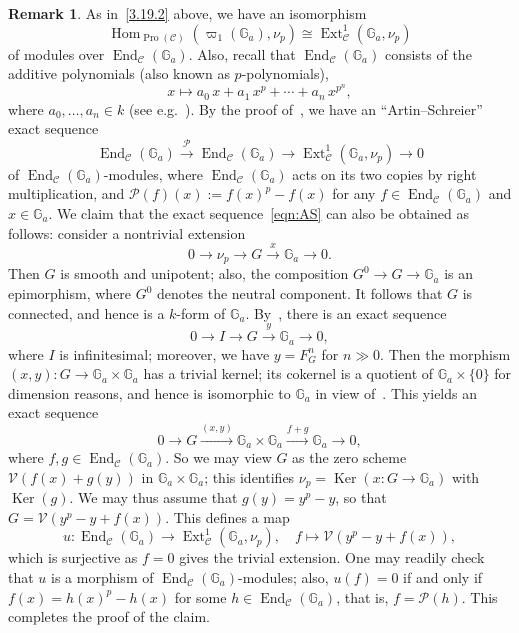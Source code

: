 \documentclass[11pt]{article}
\theoremstyle{definition}
\newtheorem{rema}[theo]{Remark}
\numberwithin{equation}{section}
\newcommand\bG{{\mathbb G}}
\newcommand\cC{{\mathcal C}}
\newcommand\cP{{\mathcal P}}
\newcommand\cV{{\mathcal V}}
\DeclareMathOperator{\End}{End}
\DeclareMathOperator{\Ext}{Ext}
\DeclareMathOperator{\Hom}{Hom}
\DeclareMathOperator{\Ker}{Ker}
\DeclareMathOperator{\Pro}{Pro}
\theoremstyle{remark}
\begin{document}
\begin{rema}
As in~\ref{3.19.2} above, we have an isomorphism
\[
\Hom_{\Pro(\cC)}(\varpi_1(\bG_a), \nu_p)
\cong \Ext^1_{\cC}(\bG_a,\nu_p)
\]
of modules over $\End_{\cC}(\bG_a)$. Also, recall that $\End_{\cC}(\bG_a)$ consists of the additive polynomials (also known as $p$-polynomials),
\[
x \longmapsto a_0 \, x + a_1 \, x^p + \cdots + a_n \, x^{p^n},
\]
where $a_0, \ldots, a_n \in k$ (see e.g.~\cite[II.3.4.4]{DG}). By the proof of~\cite[Prop.~1.20]{Saito}, we have an ``Artin--Schreier'' exact sequence
\begin{equation}\label{eqn:AS}
\End_{\cC}(\bG_a) \stackrel{\cP}{\longrightarrow}
\End_{\cC}(\bG_a)
\longrightarrow \Ext^1_{\cC}(\bG_a,\nu_p)
\longrightarrow 0
\end{equation}
of $\End_{\cC}(\bG_a)$-modules, where $\End_{\cC}(\bG_a)$ acts on its two copies by right multiplication, and $\cP(f)(x) := f(x)^p - f(x)$ for any $f \in \End_{\cC}(\bG_a)$ and $x \in \bG_a$. We claim that the exact sequence~\eqref{eqn:AS} can also be obtained as follows: consider a nontrivial extension
\[
0 \longrightarrow \nu_p \longrightarrow G
\stackrel{x}{\longrightarrow} \bG_a \longrightarrow 0.
\]
Then $G$ is smooth and unipotent; also, the composition $G^0 \to G \to \bG_a$ is an epimorphism, where $G^0$ denotes the neutral component. It follows that $G$ is connected, and hence is a $k$-form of $\bG_a$. By~\cite[Lem.~1.3]{Russell}, there is an exact sequence
\[
0 \longrightarrow I \longrightarrow G
\stackrel{y}{\longrightarrow} \bG_a \longrightarrow 0,
\]
where $I$ is infinitesimal; moreover, we have $y = F^n_G$ for $n \gg 0$. Then the morphism $(x,y) : G \to \bG_a \times \bG_a$ has a trivial kernel; its cokernel is a quotient of $\bG_a \times \{ 0 \}$ for dimension reasons, and hence is isomorphic to $\bG_a$ in view of~\cite[IV.2.1.1]{DG}. This yields an exact sequence
\[
0 \longrightarrow G
\stackrel{(x,y)}{\longrightarrow} \bG_a \times \bG_a
\stackrel{f + g}{\longrightarrow} \bG_a
\longrightarrow 0,
\]
where $f, g \in \End_{\cC}(\bG_a)$. So we may view $G$ as the zero scheme $\cV(f(x) + g(y))$ in $\bG_a \times \bG_a$; this identifies $\nu_p = \Ker(x: G \to \bG_a)$ with $\Ker(g)$. We may thus assume that $g(y) = y^p - y$, so that $G = \cV(y^p - y + f(x))$. This defines a map
\[
u : \End_{\cC}(\bG_a) \longrightarrow
\Ext^1_{\cC}(\bG_a, \nu_p), \quad f \longmapsto \cV(y^p - y + f(x)),
\]
which is surjective as $f = 0$ gives the trivial extension. One may readily check that $u$ is a morphism of $\End_{\cC}(\bG_a)$-modules; also, $u(f) = 0$ if and only if $f(x) = h(x)^p - h(x)$ for some $h \in \End_{\cC}(\bG_a)$, that is, $f =\cP(h)$. This completes the proof of the claim.


\end{rema}
\end{document}
